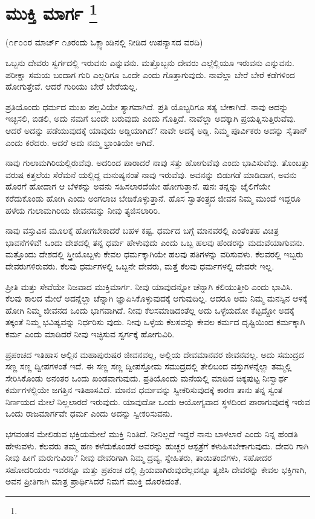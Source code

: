 
\chapter[ಮುಕ್ತಿ ಮಾರ್ಗ ]{ಮುಕ್ತಿ ಮಾರ್ಗ \protect\footnote{}}

\centerline{(೧೯೦೦ರ ಮಾರ್ಚ್​ ೧೨ರಂದು ಓಕ್ಲ್ಯಾಂಡಿನಲ್ಲಿ ನೀಡಿದ ಉಪನ್ಯಾಸದ ವರದಿ)}

ಒಬ್ಬನು ದೇವರು ಸ್ವರ್ಗದಲ್ಲಿ ಇರುವನು ಎನ್ನುವನು. ಮತ್ತೊಬ್ಬನು ದೇವರು ಎಲ್ಲೆಲ್ಲಿಯೂ ಇರುವನು ಎನ್ನುವನು. ಪರೀಕ್ಷಾ ಸಮಯ ಬಂದಾಗ ಗುರಿ ಎಲ್ಲರಿಗೂ ಒಂದೇ ಎಂದು ಗೊತ್ತಾಗುವುದು. ನಾವೆಲ್ಲಾ ಬೇರೆ ಬೇರೆ ಕಡೆಗಳಿಂದ ಹೋಗುತ್ತೇವೆ. ಆದರೆ ಗುರಿಯು ಬೇರೆ ಬೇರೆಯಲ್ಲ.

ಪ್ರತಿಯೊಂದು ಧರ್ಮದ ಮುಖ ಪಲ್ಲವಿಯೇ ತ್ಯಾಗವಾಗಿದೆ. ಪ್ರತಿ ಯೊಬ್ಬರಿಗೂ ಸತ್ಯ ಬೇಕಾಗಿದೆ. ನಾವು ಅದನ್ನು ಇಚ್ಛಿಸಲಿ, ಬಿಡಲಿ, ಅದು ನಮಗೆ ಬಂದೇ ಬರುವುದು ಎಂದು ಗೊತ್ತಿದೆ. ನಾವೆಲ್ಲಾ ಅದಕ್ಕಾಗಿ ಪ್ರಯತ್ನಿಸುತ್ತಿರುವೆವು. ಆದರೆ ಅದನ್ನು ಪಡೆಯುವುದಕ್ಕೆ ಯಾವುದು ಅಡ್ಡಿಯಾಗಿದೆ? ನಾವೇ ಅದಕ್ಕೆ ಅಡ್ಡಿ. ನಿಮ್ಮ ಪೂರ್ವಿಕರು ಅದನ್ನು ಸೈತಾನ್​ ಎಂದು ಕರೆದರು. ಆದರೆ ಅದು ನಮ್ಮ ಭ್ರಾಂತಿಯೇ ಆಗಿದೆ.

ನಾವು ಗುಲಾಮಗಿರಿಯಲ್ಲಿರುವೆವು. ಅದರಿಂದ ಪಾರಾದರೆ ನಾವು ಸತ್ತು ಹೋಗುವೆವು ಎಂದು ಭಾವಿಸುವೆವು. ತೊಂಬತ್ತು ವರುಷ ಕತ್ತಲೆಯ ಸೆರೆಮನೆ ಯಲ್ಲಿದ್ದ ಮನುಷ್ಯನಂತೆ ನಾವು ಇರುವೆವು. ಅವನನ್ನು ಬಿಡುಗಡೆ ಮಾಡಿದಾಗ, ಅವನು ಹೊರಗೆ ಹೋದಾಗ ಆ ಬೆಳಕನ್ನು ಅವನು ಸಹಿಸಲಾರದೆಯೇ ಹೋಗುತ್ತಾನೆ. ಪುನಃ ತನ್ನನ್ನು ಜೈಲಿಗೆಯೇ ಕರೆದುಕೊಂಡು ಹೋಗಿ ಎಂದು ಅಂಗಲಾಚಿ ಬೇಡಿಕೊಳ್ಳುತ್ತಾನೆ. ಹೊಸ ಸ್ವಾತಂತ್ರ್ಯದ ಜೀವನ ನಿಮ್ಮ ಮುಂದೆ ಇದ್ದರೂ ಹಳೆಯ ಗುಲಾಮಗಿರಿಯ ಜೀವನವನ್ನು ನೀವು ತ್ಯಜಿಸಲಾರಿರಿ.

ನಾವು ವಸ್ತುವಿನ ಮೂಲಕ್ಕೆ ಹೋಗಬೇಕಾದರೆ ಬಹಳ ಕಷ್ಟ. ಧರ್ಮದ ಬಗ್ಗೆ ಮಾನವರಲ್ಲಿ ಎಂತೆಂತಹ ವಿಚಿತ್ರ ಭಾವನೆಗಳಿವೆ! ಒಂದು ದೇಶದಲ್ಲಿ ತನ್ನ ಧರ್ಮ ಹೇಳುವುದು ಎಂದು ಒಬ್ಬ ಹಲವು ಹೆಂಡರನ್ನು ಮದುವೆಯಾಗುವನು. ಮತ್ತೊಂದು ದೇಶದಲ್ಲಿ ಸ್ತ್ರೀಯೊಬ್ಬಳು ಕೇವಲ ಧರ್ಮಕ್ಕಾಗಿಯೇ ಹಲವು ಪತಿಗಳನ್ನು ವರಿಸುವಳು. ಕೆಲವರಲ್ಲಿ ಇಬ್ಬರು ದೇವರುಗಳಿರುವರು. ಕೆಲವು ಧರ್ಮಗಳಲ್ಲಿ ಒಬ್ಬನೇ ದೇವರು, ಮತ್ತೆ ಕೆಲವು ಧರ್ಮಗಳಲ್ಲಿ ದೇವರೇ ಇಲ್ಲ.

ಪ್ರೀತಿ ಮತ್ತು ಸೇವೆಯೇ ನಿಜವಾದ ಮುಕ್ತಿಮಾರ್ಗ. ನೀವು ಯಾವುದನ್ನೋ ಚೆನ್ನಾಗಿ ಕಲಿಯುತ್ತೀರಿ ಎಂದು ಭಾವಿಸಿ. ಕೆಲವು ಕಾಲದ ಮೇಲೆ ಅದನ್ನೆಲ್ಲಾ ಚೆನ್ನಾಗಿ ಜ್ಞಾಪಿಸಿಕೊಳ್ಳುವುದಕ್ಕೆ ಆಗುವುದಿಲ್ಲ. ಆದರೂ ಅದು ನಿಮ್ಮ ಮನಸ್ಸಿನ ಆಳಕ್ಕೆ ಹೋಗಿ ನಿಮ್ಮ ಜೀವನದ ಒಂದು ಭಾಗವಾಗಿದೆ. ನೀವು ಕೆಲಸಮಾಡಿದಂತೆಲ್ಲ ಅದು ಒಳ್ಳೆಯದೋ ಕೆಟ್ಟದ್ದೋ ಅದಕ್ಕೆ ತಕ್ಕಂತೆ ನಿಮ್ಮ ಭವಿಷ್ಯವನ್ನು ನಿರ್ಧರಿಸು ವುದು. ನೀವು ಒಳ್ಳೆಯ ಕೆಲಸವನ್ನು ಕೇವಲ ಕರ್ಮದ ದೃಷ್ಟಿಯಿಂದ ಕರ್ಮಕ್ಕಾಗಿ ಕರ್ಮ ಎಂದು ಮಾಡಿದರೆ ನೀವು ಇಚ್ಛಿಸುವ ಸ್ವರ್ಗಕ್ಕೆ ಹೋಗುವಿರಿ.

ಪ್ರಪಂಚದ ಇತಿಹಾಸ ಅಲ್ಲಿನ ಮಹಾಪುರುಷರ ಜೀವನವಲ್ಲ, ಅಲ್ಲಿಯ ದೇವಮಾನವರ ಜೀವನವಲ್ಲ. ಅದು ಸಮುದ್ರದ ಸಣ್ಣ ಸಣ್ಣ ದ್ವೀಪಗಳಂತೆ ಇದೆ. ಈ ಸಣ್ಣ ಸಣ್ಣ ದ್ವೀಪಸ್ತೋಮ ಸಮುದ್ರದಲ್ಲಿ ತೇಲಿಬಂದ ವಸ್ತುಗಳನ್ನೆಲ್ಲಾ ತಮ್ಮಲ್ಲಿ ಸೇರಿಸಿಕೊಂಡು ಅನಂತರ ಒಂದು ಖಂಡವಾಗುವುದು. ಪ್ರತಿಯೊಂದು ಮನೆಯಲ್ಲಿ ಮಾಡಿದ ಚಿಕ್ಕಪುಟ್ಟ ನಿಃಸ್ವಾರ್ಥ ಕರ್ಮಗಳಲ್ಲಿಯೇ ಜಗತ್ತಿನ ಇತಿಹಾಸವಿದೆ. ಮಾನವ ಧರ್ಮವನ್ನು ಸ್ವೀಕರಿಸುವುದಕ್ಕೆ ಕಾರಣ ತಾನು ತನ್ನ ಸ್ವಂತ ನಿರ್ಣಯದ ಮೇಲೆ ನಿಲ್ಲಲಾರದೆ ಇರುವುದು. ಯಾವುದೋ ಒಂದು ಆಯೋಗ್ಯವಾದ ಸ್ಥಳದಿಂದ ಪಾರಾಗುವುದಕ್ಕೆ ಇರುವ ಒಂದು ರಾಜಮಾರ್ಗವೇ ಧರ್ಮ ಎಂದು ಅದನ್ನು ಸ್ವೀಕರಿಸುವನು.

ಭಗವಂತನ ಮೇಲಿಡುವ ಭಕ್ತಿಯಮೇಲೆ ಮುಕ್ತಿ ನಿಂತಿದೆ. ನೀನಿಲ್ಲದೆ ಇದ್ದರೆ ನಾನು ಬಾಳಲಾರೆ ಎಂದು ನಿನ್ನ ಹೆಂಡತಿ ಹೇಳುವಳು. ಕೆಲವರು ತಮ್ಮ ಹಣ ಕಳೆದುಕೊಂಡರೆ ಅವರನ್ನು ಹುಚ್ಚರ ಆಸ್ಪತ್ರೆಗೆ ಕಳುಹಿಸಬೇಕಾಗುವುದು. ದೇವರಿ ಗಾಗಿ ನೀವು ಹೀಗೆ ಮರುಗುವಿರಾ? ನೀವು ದೇವರಿಗಾಗಿ ನಿಮ್ಮ ದ್ರವ್ಯ, ಸ್ನೇಹಿತರು, ತಾಯಿತಂದೆಗಳು, ಸಹೋದರ ಸಹೋದರಿಯರು ಇವರನ್ನೂ ಮತ್ತು ಪ್ರಪಂಚ ದಲ್ಲಿ ಪ್ರಿಯವಾಗಿರುವುದೆಲ್ಲವನ್ನೂ ತ್ಯಜಿಸಿ ದೇವರನ್ನು ಕೇವಲ ಭಕ್ತಿಗಾಗಿ, ಅವನ ಪ್ರೀತಿಗಾಗಿ ಮಾತ್ರ ಪ್ರಾರ್ಥಿಸಿದರೆ ನಿಮಗೆ ಮುಕ್ತಿ ದೊರಕಿದಂತೆ.

